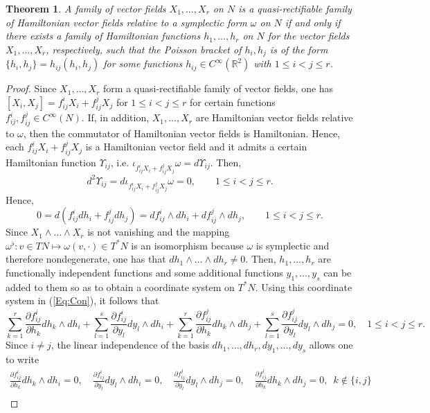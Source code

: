 \documentclass[12pt]{article}
\theoremstyle{plain}
\newtheorem{theorem}{Theorem}[section]
\theoremstyle{definition}
\numberwithin{equation}{section}
\begin{document}
\begin{theorem}\label{Th:HamRec} A family of vector fields $X_1,\ldots,X_r$ on $N$ is a quasi-rectifiable family of Hamiltonian vector fields relative to a symplectic form $\omega$ on $N$ if and only if there exists a family of Hamiltonian functions $h_1,\ldots,h_r$ on $N$ for the vector fields $X_1,\ldots,X_r$, respectively, such that the Poisson bracket of $h_i,h_j$ is of the form $\{h_i,h_j\}=h_{ij}(h_i,h_j)$ for some functions $h_{ij}\in C^\infty(\mathbb{R}^2)$ with $1\leq i<j\leq r$.
\end{theorem}
\begin{proof} Since $X_1,\ldots,X_r$ form a quasi-rectifiable family of vector fields, one has  $[X_i,X_j]=f_{ij}^iX_i+f_{ij}^jX_j$ for $1\leq i<j\leq r$ for certain functions $f_{ij}^i,f_{ij}^j\in C^\infty(N)$. If, in addition, $X_1,\ldots,X_r$ are Hamiltonian vector fields relative to $\omega$, then the commutator of Hamiltonian vector fields is Hamiltonian. Hence, each $f_{ij}^iX_i+f_{ij}^jX_j$ is a Hamiltonian vector field and it admits a certain Hamiltonian function $\Upsilon_{ij}$, i.e. $\iota_{f_{ij}^iX_i+f_{ij}^jX_j}
\omega=d\Upsilon_{ij}$. Then,
$$
d^2\Upsilon_{ij}=d\iota_{f_{ij}^iX_i+f_{ij}^jX_j}\omega=0,\qquad 1\leq i<j\leq r.
$$
Hence,
\begin{equation}\label{Eq:Con}
0=d(f_{ij}^idh_i+f_{ij}^jdh_j)=df_{ij}^i\wedge dh_i+df_{ij}^j\wedge dh_j,\qquad 1\leq i<j\leq r.
\end{equation}
Since $X_1\wedge\ldots\wedge X_r$ is not vanishing and the mapping $\omega^\flat:v\in TN\mapsto \omega(v,\cdot)\in T^*N$ is an isomorphism because $\omega$ is symplectic and therefore nondegenerate, one has that $dh_1\wedge\ldots\wedge dh_r\neq 0$. Then, $h_1,\ldots,h_r$ are functionally independent functions and some additional functions $y_1,\ldots,y_s$ can be added to them so as to obtain a coordinate system on $T^*N$. Using this coordinate system in (\ref{Eq:Con}), it follows that
$$
\sum_{k=1}^r\frac{\partial f_{ij}^i}{\partial h_k}dh_k\wedge dh_i+\sum_{l=1}^s\frac{\partial f_{ij}^i}{\partial y_l}dy_l\wedge dh_i+\sum_{k=1}^r\frac{\partial f_{ij}^j}{\partial h_k}dh_k\wedge dh_j+\sum_{l=1}^s\frac{\partial f_{ij}^j}{\partial y_l}dy_l\wedge dh_j=0,\quad 1\leq i<j\leq r.
$$
Since $i\neq j$, the linear independence of the basis $dh_1,\ldots,dh_r,dy_1,\ldots,dy_s$ allows one to write
$$
\begin{gathered}
\frac{\partial f_{ij}^i}{\partial h_k}dh_k\wedge dh_i=0,\quad \frac{\partial f_{ij}^i}{\partial y_l}dy_l\wedge dh_i=0,\quad \frac{\partial f_{ij}^j}{\partial y_l}dy_l\wedge dh_j=0,\quad \frac{\partial f_{ij}^j}{\partial h_k}dh_k\wedge dh_j=0,\,\,\,k\notin \{i,j\}\\

\end{gathered}$$
\end{proof}
\end{document}
